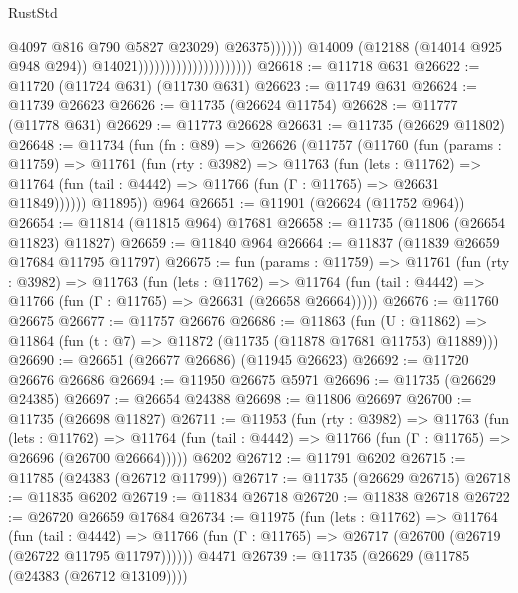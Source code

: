 \begin{lexlean}{RustStd}
\begin{coremodule}
                                                            @4097
                                                            @816
                                                            @790
                                                            @5827
                                                            @23029)
                                                          @26375))))))
                                              @14009
                                              (@12188 (@14014 @925 @948 @294))
                                              @14021)))))))))))))))))))))
@26618 := @11718 @631
@26622 := @11720 (@11724 @631) (@11730 @631)
@26623 := @11749 @631
@26624 := @11739 @26623
@26626 := @11735 (@26624 @11754)
@26628 := @11777 (@11778 @631)
@26629 := @11773 @26628
@26631 := @11735 (@26629 @11802)
@26648 := @11734
    (fun (fn : @89) =>
    @26626
      (@11757
        (@11760
          (fun (params : @11759) =>
          @11761
            (fun (rty : @3982) =>
            @11763
              (fun (lets : @11762) =>
              @11764 (fun (tail : @4442) => @11766 (fun (Γ : @11765) => @26631 @11849))))))
        @11895))
    @964
@26651 := @11901 (@26624 (@11752 @964))
@26654 := @11814 (@11815 @964) @17681
@26658 := @11735 (@11806 (@26654 @11823) @11827)
@26659 := @11840 @964
@26664 := @11837 (@11839 @26659 @17684 @11795 @11797)
@26675 := fun (params : @11759) =>
  @11761
    (fun (rty : @3982) =>
    @11763
      (fun (lets : @11762) =>
      @11764 (fun (tail : @4442) => @11766 (fun (Γ : @11765) => @26631 (@26658 @26664)))))
@26676 := @11760 @26675
@26677 := @11757 @26676
@26686 := @11863
    (fun (U : @11862) => @11864 (fun (t : @7) => @11872 (@11735 (@11878 @17681 @11753) @11889)))
@26690 := @26651 (@26677 @26686) (@11945 @26623)
@26692 := @11720 @26676 @26686
@26694 := @11950 @26675 @5971
@26696 := @11735 (@26629 @24385)
@26697 := @26654 @24388
@26698 := @11806 @26697
@26700 := @11735 (@26698 @11827)
@26711 := @11953
    (fun (rty : @3982) =>
    @11763
      (fun (lets : @11762) =>
      @11764 (fun (tail : @4442) => @11766 (fun (Γ : @11765) => @26696 (@26700 @26664)))))
    @6202
@26712 := @11791 @6202
@26715 := @11785 (@24383 (@26712 @11799))
@26717 := @11735 (@26629 @26715)
@26718 := @11835 @6202
@26719 := @11834 @26718
@26720 := @11838 @26718
@26722 := @26720 @26659 @17684
@26734 := @11975
    (fun (lets : @11762) =>
    @11764
      (fun (tail : @4442) =>
      @11766 (fun (Γ : @11765) => @26717 (@26700 (@26719 (@26722 @11795 @11797))))))
    @4471
@26739 := @11735 (@26629 (@11785 (@24383 (@26712 @13109))))

\end{coremodule}
\end{lexlean}
